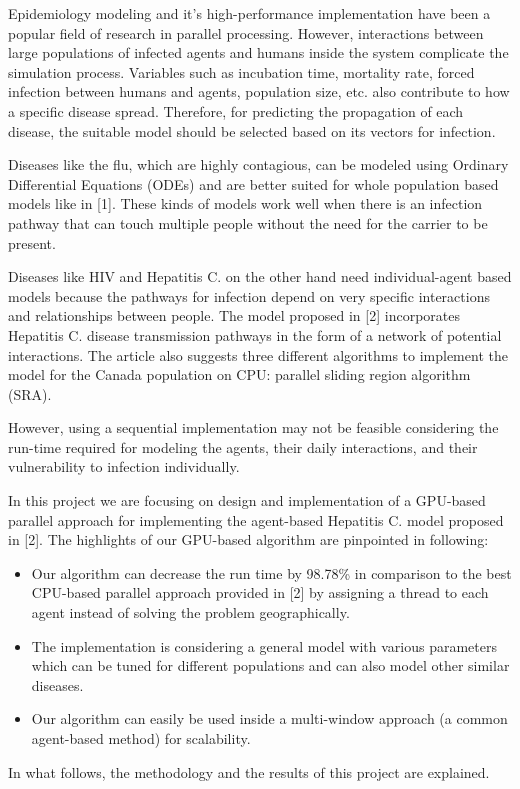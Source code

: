 \documentclass[conference]{IEEEtran}
\begin{document}
Epidemiology modeling and it’s high-performance implementation have been a popular field of research in parallel processing. However, interactions between large populations of infected agents and humans inside the system complicate the simulation process. Variables such as incubation time, mortality rate, forced infection between humans and agents, population size, etc. also contribute to how a specific disease spread. Therefore, for predicting the propagation of each disease, the suitable model should be selected based on its vectors for infection.\par
Diseases like the flu, which are highly contagious, can be modeled using Ordinary Differential Equations (ODEs) and are better suited for whole population based models like in [1]. These kinds of models work well when there is an infection pathway that can touch multiple people without the need for the carrier to be present.\par
Diseases like HIV and Hepatitis C. on the other hand need individual-agent based models because the pathways for infection depend on very specific interactions and relationships between people. The model proposed in [2] incorporates Hepatitis C. disease transmission pathways in the form of a network of potential interactions. The article also suggests three different algorithms to implement the model for the Canada population on CPU: parallel sliding region algorithm (SRA).\par
However, using a sequential implementation may not be feasible considering the run-time required for modeling the agents, their daily interactions, and their vulnerability to infection individually.\par
In this project we are focusing on design and implementation of a GPU-based parallel approach for implementing the agent-based Hepatitis C. model proposed in [2]. The highlights of our GPU-based algorithm are pinpointed in following:\par
\begin{itemize}
\item  Our algorithm can decrease the run time by 98.78\% in comparison to the best CPU-based parallel approach provided in [2] by assigning a thread to each agent instead of solving the problem geographically.

\item The implementation is considering a general model with various parameters which can be tuned for different populations and can also model other similar diseases.

\item Our algorithm can easily be used inside a multi-window approach (a common agent-based method) for scalability.

\end{itemize}
\par In what follows, the methodology and the results of this project are explained.\par
\end{document}
